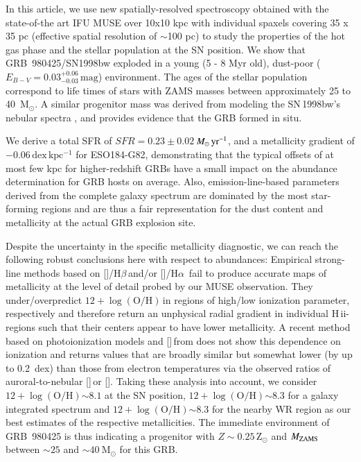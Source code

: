 \documentclass[traditabstract]{aa}
\newcommand{\hb}{H$\beta$}
\newcommand{\ha}{H$\alpha$}
\newcommand{\hii}{\mbox{H\,{\sc ii}}}
\newcommand{\oh}{$12+\log(\mathrm{O/H})$}
\newcommand{\sii}{[\ion{S}{ii}]}
\newcommand{\siii}{[\ion{S}{iii}]}
\newcommand{\oiii}{[\ion{O}{iii}]}
\newcommand{\nii}{[\ion{N}{ii}]}
\newcommand{\Msunyr}{$M_\odot\,\rm{yr}^{-1}$}
\begin{document}
In this article, we use new spatially-resolved spectroscopy obtained with the state-of-the art IFU MUSE over 10x10 kpc with individual spaxels covering 35 x 35 pc (effective spatial resolution of $\sim$100 pc) to study the properties of the hot gas phase and the stellar population at the SN position. We show that GRB~980425/SN1998bw exploded in a young (5 - 8 Myr old), dust-poor ($E_{B-V} = 0.03_{-0.03}^{+0.06}\,\mathrm{mag}$) environment. The ages of the stellar population correspond to life times of stars with ZAMS masses between approximately 25 to 40~M$_{\odot}$. A similar progenitor mass was derived from modeling the SN\,1998bw's nebular spectra \citep{2006ApJ...640..854M}, and provides evidence that the GRB formed in situ.

We derive a total SFR of $SFR=0.23\pm0.02$\,\Msunyr, and a metallicity gradient of $-0.06\,\mathrm{dex\,kpc^{-1}}$ for ESO184-G82, demonstrating that the typical offsets of at most few kpc for higher-redshift GRBs have a small impact on the abundance determination for GRB hosts on average. Also, emission-line-based parameters derived from the complete galaxy spectrum are dominated by the most star-forming regions and are thus a fair representation for the dust content and metallicity at the actual GRB explosion site.

Despite the uncertainty in the specific metallicity diagnostic, we can reach the following robust conclusions here with respect to abundances: Empirical strong-line methods based on \oiii/\hb\,and/or \nii/\ha\, fail to produce accurate maps of metallicity at the level of detail probed by our MUSE observation. They under/overpredict \oh\,in regions of high/low ionization parameter, respectively and therefore return an unphysical radial gradient in individual \hii-regions such that their centers appear to have lower metallicity. A recent method based on photoionization models and \sii\,from \citet{2016Ap&SS.361...61D} does not show this dependence on ionization and returns values that are broadly similar but somewhat lower (by up to 0.2~dex) than those from electron temperatures via the observed ratios of auroral-to-nebular \siii\,or \oiii. Taking these analysis into account, we consider \oh$\sim8.1$ at the SN position, \oh$\sim8.3$ for a galaxy integrated spectrum and \oh$\sim8.3$ for the nearby WR region as our best estimates of the respective metallicities. The immediate environment of GRB~980425 is thus indicating a progenitor with $Z\sim0.25\,\mathrm{Z}_\odot$ and $M_{\rm{ZAMS}}$ between $\sim 25$ and $\sim40~\mathrm{M}_{\odot}$ for this GRB.
\end{document}
